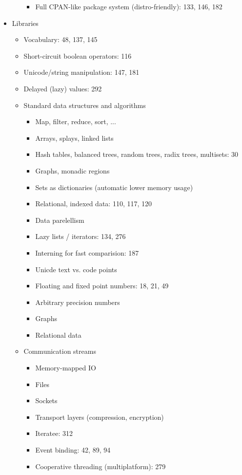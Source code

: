 \begin{itemize}
\begin{itemize}
\begin{itemize}
    \item Full CPAN-like package system (distro-friendly): 133, 146, 182
    \end{itemize}
  \end{itemize}
\item Libraries
  \begin{itemize}
  \item Vocabulary: 48, 137, 145
  \item Short-circuit boolean operators: 116
  \item Unicode/string manipulation: 147, 181
  \item Delayed (lazy) values: 292
  \item Standard data structures and algorithms
    \begin{itemize}
    \item Map, filter, reduce, sort, ...
    \item Arrays, splays, linked lists
    \item Hash tables, balanced trees, random trees, radix trees, multisets: 30
    \item Graphs, monadic regions
    \item Sets as dictionaries (automatic lower memory usage)
    \item Relational, indexed data: 110, 117, 120
    \item Data parelellism
    \item Lazy lists / iterators: 134, 276
    \item Interning for fast comparision: 187
    \item Unicde text vs. code points
    \item Floating and fixed point numbers: 18, 21, 49
    \item Arbitrary precision numbers
    \item Graphs
    \item Relational data
    \end{itemize}
  \item Communication streams
    \begin{itemize}
    \item Memory-mapped IO
    \item Files
    \item Sockets
    \item Transport layers (compression, encryption)
    \item Iteratee: 312
    \item Event binding: 42, 89, 94
    \item Cooperative threading (multiplatform): 279

\end{itemize}
\end{itemize}
\end{itemize}
